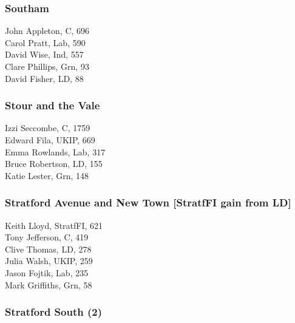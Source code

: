 \documentclass[a4paper,openany,10pt]{book}
\begin{document}
\subsubsection*{Southam}



John Appleton, C, 696\\
Carol Pratt, Lab, 590\\
David Wise, Ind, 557\\
Clare Phillips, Grn, 93\\
David Fisher, LD, 88\\


\subsubsection*{Stour and the Vale}



Izzi Seccombe, C, 1759\\
Edward Fila, UKIP, 669\\
Emma Rowlands, Lab, 317\\
Bruce Robertson, LD, 155\\
Katie Lester, Grn, 148\\


\subsubsection*{Stratford Avenue and New Town \hspace*{\fill}\nolinebreak[1]%
\enspace\hspace*{\fill}
[StratfFI gain from LD]}



Keith Lloyd, StratfFI, 621\\
Tony Jefferson, C, 419\\
Clive Thomas, LD, 278\\
Julia Walsh, UKIP, 259\\
Jason Fojtik, Lab, 235\\
Mark Griffiths, Grn, 58\\


\subsubsection*{Stratford South (2)}
\end{document}
